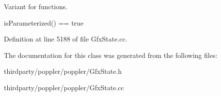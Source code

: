 Variant for functions.

is\+Parameterized() == true 

Definition at line 5188 of file Gfx\+State.\+cc.



The documentation for this class was generated from the following files\+:\begin{DoxyCompactItemize}
\item 
thirdparty/poppler/poppler/Gfx\+State.\+h\item 
thirdparty/poppler/poppler/Gfx\+State.\+cc\end{DoxyCompactItemize}
